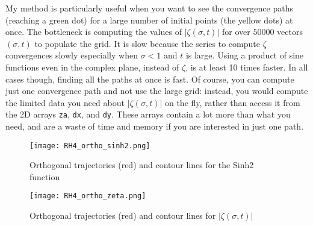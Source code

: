 \documentclass[oneside,10pt]{book}
\begin{document}
My method is particularly useful when you want to see the convergence paths (reaching a green dot) for a large number of initial points (the yellow dots) at once. The bottleneck is computing the values of $|\zeta(\sigma,t)|$ for over $\num{50000}$ vectors $(\sigma, t)$ to
 populate the grid. It is slow because the series to compute $\zeta$ convergences slowly especially when $\sigma<1$ and $t$ is large. Using a product of sine functions even in the complex plane, instead of $\zeta$, is at least 10 times faster. In all cases though, finding all the paths at once is fast.
 Of course, you can compute just one convergence path and not use the large grid: instead, you would compute the limited data you need about $|\zeta(\sigma,t)|$  on the fly, rather than access it from the 2D arrays \texttt{za}, \texttt{dx}, and \texttt{dy}. These arrays contain a lot more than what you need, and are a waste of time and memory if you are interested in just one path.

\begin{figure}%
\centering
\texttt{[image: RH4\_ortho\_sinh2.png]}
\caption{Orthogonal trajectories (red) and contour lines for the Sinh2 function}
\label{fig:ortho1}
\end{figure}


\begin{figure}%
\centering
\texttt{[image: RH4\_ortho\_zeta.png]}
\caption{Orthogonal trajectories (red) and contour lines for $|\zeta(\sigma,t)|$}
\label{fig:ortho2}
\end{figure}

\end{document}
